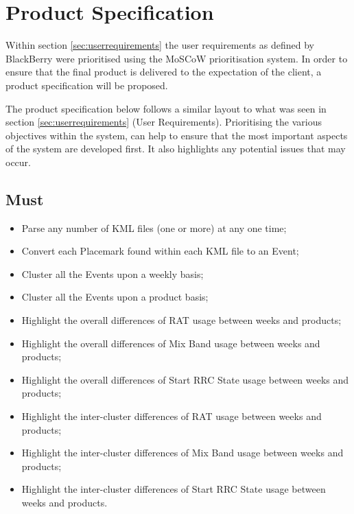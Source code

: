 \section{Product Specification}

Within section \ref{sec:userrequirements} the user requirements as defined by 
BlackBerry were prioritised using the MoSCoW prioritisation system. In order to 
ensure that the final product is delivered to the expectation of the client, a
product specification will be proposed. 

The product specification below follows a similar layout to what was seen in 
section \ref{sec:userrequirements} (User Requirements). Prioritising the 
various objectives within the system, can help to ensure that the most 
important aspects of the system are developed first. It also highlights any 
potential issues that may occur.


\subsection{Must}
\begin{itemize}
  \item Parse any number of KML files (one or more) at any one time;
  \item Convert each Placemark found within each KML file to an Event;
  \item Cluster all the Events upon a weekly basis;
  \item Cluster all the Events upon a product basis;
  \item Highlight the overall differences of RAT usage between weeks and 
        products;
  \item Highlight the overall differences of Mix Band usage between weeks and 
        products;
  \item Highlight the overall differences of Start RRC State usage between 
        weeks and products;
  \item Highlight the inter-cluster differences of RAT usage between weeks and 
        products;
  \item Highlight the inter-cluster differences of Mix Band usage between weeks 
        and products;
  \item Highlight the inter-cluster differences of Start RRC State usage  
        between weeks and products.
\end{itemize}



